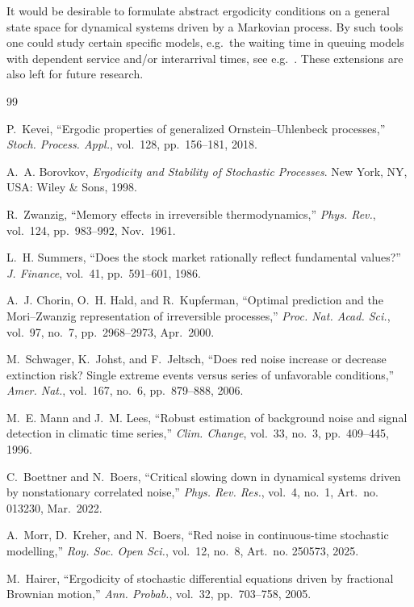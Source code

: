 \documentclass{article}
\begin{document}
It would be desirable to formulate abstract ergodicity conditions on
a general state space for dynamical systems driven by a Markovian process.  
By such tools one could study certain specific models, e.g.\ the waiting time in queuing models with dependent 
service and/or interarrival times, see e.g.\ \cite{attila3}. 
These extensions are also left for future research. 


\begin{thebibliography}{99}

 P.~Kevei, ``Ergodic properties of generalized Ornstein--Uhlenbeck processes,'' \emph{Stoch. Process. Appl.}, vol.~128, pp.~156--181, 2018.

 A.~A. Borovkov, \emph{Ergodicity and Stability of Stochastic Processes}. New York, NY, USA: Wiley \& Sons, 1998.

 R.~Zwanzig, ``Memory effects in irreversible thermodynamics,'' \emph{Phys. Rev.}, vol.~124, pp.~983--992, Nov.~1961.

 L.~H. Summers, ``Does the stock market rationally reflect fundamental values?'' \emph{J. Finance}, vol.~41, pp.~591--601, 1986.

 A.~J. Chorin, O.~H. Hald, and R.~Kupferman, ``Optimal prediction and the Mori--Zwanzig representation of irreversible processes,'' \emph{Proc. Nat. Acad. Sci.}, vol.~97, no.~7, pp.~2968--2973, Apr.~2000.

 M.~Schwager, K.~Johst, and F.~Jeltsch, ``Does red noise increase or decrease extinction risk? Single extreme events versus series of unfavorable conditions,'' \emph{Amer. Nat.}, vol.~167, no.~6, pp.~879--888, 2006.

 M.~E. Mann and J.~M. Lees, ``Robust estimation of background noise and signal detection in climatic time series,'' \emph{Clim. Change}, vol.~33, no.~3, pp.~409--445, 1996.

 C.~Boettner and N.~Boers, ``Critical slowing down in dynamical systems driven by nonstationary correlated noise,'' \emph{Phys. Rev. Res.}, vol.~4, no.~1, Art.~no. 013230, Mar.~2022.

 A.~Morr, D.~Kreher, and N.~Boers, ``Red noise in continuous-time stochastic modelling,'' \emph{Roy. Soc. Open Sci.}, vol.~12, no.~8, Art.~no. 250573, 2025.

 M.~Hairer, ``Ergodicity of stochastic differential equations driven by fractional Brownian motion,'' \emph{Ann. Probab.}, vol.~32, pp.~703--758, 2005.  
  

\end{thebibliography}
\end{document}
